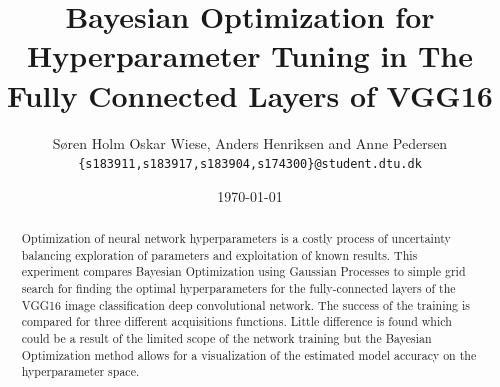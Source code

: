 \documentclass[12pt,fleqn]{article}
\title{\vspace*{-3.75cm}Bayesian Optimization for Hyperparameter Tuning in The Fully Connected Layers of VGG16}
\author{Søren Holm Oskar Wiese, Anders Henriksen and Anne Pedersen \\
\small {\texttt{\{s183911,s183917,s183904,s174300\}@student.dtu.dk}}}
\date{\today}
\begin{document}
\maketitle


\begin{abstract}
\noindent Optimization of neural network hyperparameters is a costly process of uncertainty balancing exploration of parameters and exploitation of known results. This experiment compares Bayesian Optimization using Gaussian Processes to  simple grid search for finding the optimal hyperparameters for the fully-connected layers of the VGG16 image classification deep convolutional network. The success of the training is compared for three different acquisitions functions. Little difference is found which could be a result of the limited scope of the network training but the Bayesian Optimization method allows for a visualization of the estimated model accuracy on the hyperparameter space.

\end{abstract}
\end{document}
